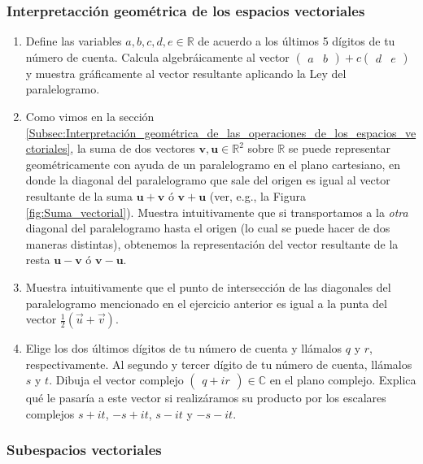 \documentclass[12pt,dvipsnames]{article}
\begin{document}
\subsubsection{Interpretacción geométrica de los espacios vectoriales}

\begin{enumerate}
        \item Define las variables $a,b,c,d,e\in\mathbb{R}$ de acuerdo a los últimos 5 dígitos de tu número de cuenta. Calcula algebráicamente al vector $\begin{pmatrix}a & b\end{pmatrix}+c\begin{pmatrix}d & e\end{pmatrix}$ y muestra gráficamente al vector resultante aplicando la Ley del paralelogramo. 
                \item Como vimos en la sección \ref{Subsec:Interpretación_geométrica_de_las_operaciones_de_los_espacios_vectoriales}, la suma de dos vectores $\mathbf{v},\mathbf{u}\in\mathbb{R}^2$ sobre $\mathbb{R}$ se puede representar geométricamente con ayuda de un paralelogramo en el plano cartesiano, en donde la diagonal del paralelogramo que sale del origen es igual al vector resultante de la suma $\mathbf{u}+\mathbf{v}$ ó $\mathbf{v}+\mathbf{u}$ (ver, e.g., la Figura \ref{fig:Suma_vectorial}). Muestra intuitivamente que si transportamos a la \emph{otra} diagonal del paralelogramo hasta el origen (lo cual se puede hacer de dos maneras distintas), obtenemos la representación del vector resultante de la resta $\mathbf{u}-\mathbf{v}$ ó $\mathbf{v}-\mathbf{u}$. 
                        \item Muestra intuitivamente que el punto de intersección de las diagonales del paralelogramo mencionado en el ejercicio anterior es igual a la punta del vector $\frac{1}{2}(\vec{u}+\vec{v})$. 
                                \item Elige los dos últimos dígitos de tu número de cuenta y llámalos $q$ y $r$, respectivamente. Al segundo y tercer dígito de tu número de cuenta, llámalos $s$ y $t$. Dibuja el vector complejo $\begin{pmatrix} q + ir \end{pmatrix}\in\mathbb{C}$ en el plano complejo. Explica qué le pasaría a este vector si realizáramos su producto por los escalares complejos $s+it$, $-s+it$, $s-it$ y $-s-it$. 
\end{enumerate}

\subsubsection{Subespacios vectoriales}
\end{document}
